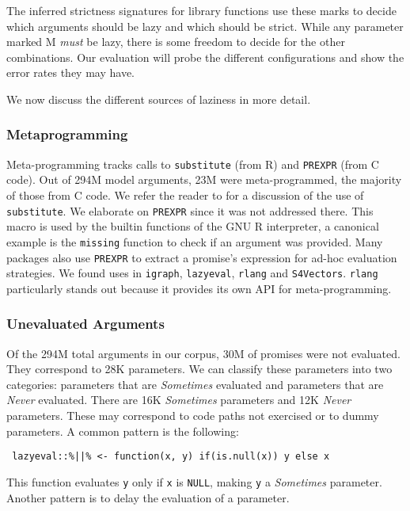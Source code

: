 \documentclass[review,creen,acmsmall]{acmart}
\newcommand{\sometimes}{\emph{Sometimes}\xspace}
\newcommand{\never}{\emph{Never}\xspace}
\newcommand{\code}[1]{\lstinline |#1|\xspace}
\begin{document}
The inferred strictness signatures for library functions use these marks to
decide which arguments should be lazy and which should be strict. While any
parameter marked M \emph{must} be lazy, there is some freedom to decide for the
other combinations. Our evaluation will probe the different configurations and
show the error rates they may have.

\medskip

We now discuss the different sources of laziness in more detail.

\subsubsection{Metaprogramming}

Meta-programming tracks calls to \code{substitute} (from R) and \code{PREXPR}
(from C code). Out of 294M model arguments, 23M were meta-programmed, the
majority of those from C code. We refer the reader to \citet{oopsla19b} for a
discussion of the use of \code{substitute}. We elaborate on \code{PREXPR} since
it was not addressed there. This macro is used by the builtin functions of the
GNU R interpreter, a canonical example is the \code{missing} function to check
if an argument was provided. Many packages also use \code{PREXPR} to extract a
promise's expression for ad-hoc evaluation strategies. We found uses in
\code{igraph}, \code{lazyeval}, \code{rlang} and \code{S4Vectors}. \code{rlang}
particularly stands out because it provides its own API for meta-programming.

\subsubsection{Unevaluated Arguments}

Of the 294M total arguments in our corpus, 30M of promises were not evaluated. They
correspond to 28K parameters. We can classify these parameters into two
categories: parameters that are \sometimes evaluated and parameters that are
\never evaluated. There are 16K \sometimes parameters and 12K \never parameters.
These may correspond to code paths not exercised or to dummy parameters.
%
A common pattern is the following:
%
\begin{lstlisting}
 lazyeval::%||% <- function(x, y) if(is.null(x)) y else x
\end{lstlisting}
%
This function evaluates \code{y} only if \code{x} is \code{NULL}, making
\code{y} a \sometimes parameter.
\noindent
Another pattern is to delay the evaluation of a parameter.
\end{document}

